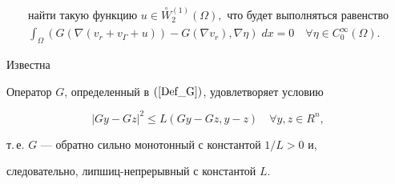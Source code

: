 \begin{equation}\label{Int_Omega_new}


\begin{array}{c}


\text{найти такую функцию } u \in \overset{\circ}{W}{}^{(1)}_{2} (\Omega),


\text{ что будет выполняться равенство}\\[2mm]


\displaystyle\int_{\Omega } (G(\nabla (v_{r}+v_{\Gamma}+u))-


G (\nabla v_{r}), \nabla \eta) \; dx = 0


\quad \forall \eta \in C^{\infty}_{0}(\Omega).


\end{array}


\end{equation}





Известна





\begin{lem}


\label {b21_L1}


Оператор $G$, определенный в $(\ref{Def_G})$, удовлетворяет условию


\begin{equation}


|G y -G z|^2 \leq L (G y -G z, y-z)


\quad \forall y, z \in R^{ n},


\label{b21_03}


\end{equation}


т.\,е. $G$ --- обратно сильно монотонный с константой $1/L > 0$ и,


следовательно, липшиц-непрерывный с константой $L$.


\end{lem}





